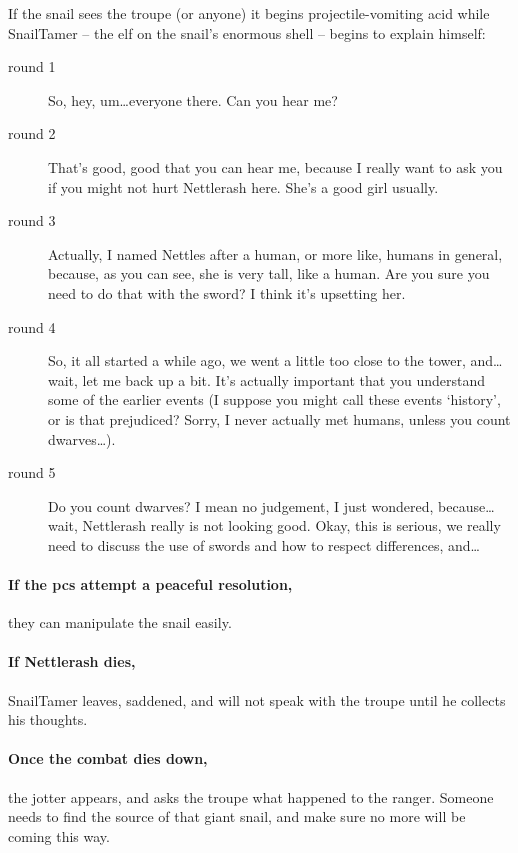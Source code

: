 If the snail sees the troupe (or anyone) it begins projectile-vomiting acid while \gls{SnailTamer} -- the elf on the snail's enormous shell -- begins to explain himself:

\begin{description}
  \item[round 1] So, hey, um\ldots everyone there.
  Can you hear me?

  \item[round 2] That's good, good that you can hear me, because I really want to ask you if you might not hurt Nettlerash here.
  She's a good girl usually.

  \item[round 3] Actually, I named Nettles after a human, or more like, humans in general, because, as you can see, she is very tall, like a human.
  Are you sure you need to do that with the sword?
  I think it's upsetting her.

  \item[round 4] So, it all started a while ago, we went a little too close to the tower, and\ldots wait, let me back up a bit.
  It's actually important that you understand some of the earlier events (I suppose you might call these events `history', or is that prejudiced?
  Sorry, I never actually met humans, unless you count dwarves\ldots).

  \item[round 5] Do you count dwarves?
  I mean no judgement, I just wondered, because\ldots wait, Nettlerash really is not looking good.
  Okay, this is serious, we really need to discuss the use of swords and how to respect differences, and\ldots
\end{description}

\paragraph{If the \glspl{pc} attempt a peaceful resolution,}
they can manipulate the snail easily.

\paragraph{If Nettlerash dies,}
\gls{SnailTamer} leaves, saddened, and will not speak with the troupe until he collects his thoughts.

\paragraph{Once the combat dies down,}
the \gls{jotter} appears, and asks the troupe what happened to the ranger.
Someone needs to find the source of that giant snail, and make sure no more will be coming this way.

